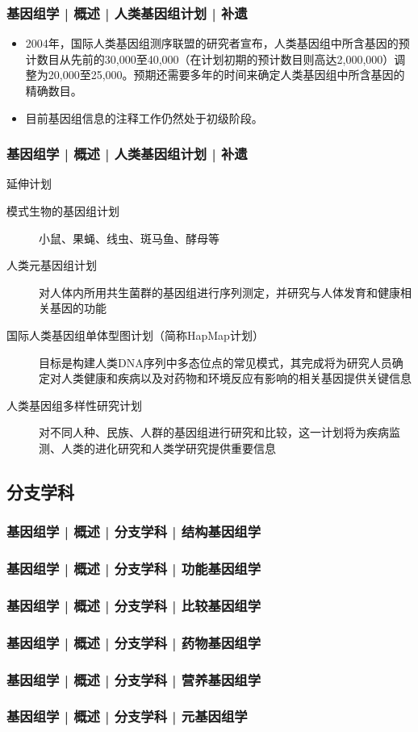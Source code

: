 \begin{frame}
  \frametitle{基因组学 | 概述 | 人类基因组计划 | 补遗}
  \begin{itemize}
    \item 2004年，国际人类基因组测序联盟的研究者宣布，人类基因组中所含基因的预计数目从先前的30,000至40,000（在计划初期的预计数目则高达2,000,000）调整为20,000至25,000。预期还需要多年的时间来确定人类基因组中所含基因的精确数目。
    \item 目前基因组信息的注释工作仍然处于初级阶段。
  \end{itemize}
\end{frame}

\begin{frame}
  \frametitle{基因组学 | 概述 | 人类基因组计划 | 补遗}
  \begin{block}{延伸计划}
    \begin{description}
      \item[模式生物的基因组计划] 小鼠、果蝇、线虫、斑马鱼、酵母等
      \item[人类元基因组计划] 对人体内所用共生菌群的基因组进行序列测定，并研究与人体发育和健康相关基因的功能
      \item[国际人类基因组单体型图计划（简称HapMap计划）] 目标是构建人类DNA序列中多态位点的常见模式，其完成将为研究人员确定对人类健康和疾病以及对药物和环境反应有影响的相关基因提供关键信息 
      \item[人类基因组多样性研究计划] 对不同人种、民族、人群的基因组进行研究和比较，这一计划将为疾病监测、人类的进化研究和人类学研究提供重要信息
    \end{description}
  \end{block}
\end{frame}

\subsection{分支学科}
\begin{frame}[label=current]
  \frametitle{基因组学 | 概述 | 分支学科 | 结构基因组学}
\end{frame}

\begin{frame}[label=current]
  \frametitle{基因组学 | 概述 | 分支学科 | 功能基因组学}
\end{frame}

\begin{frame}[label=current]
  \frametitle{基因组学 | 概述 | 分支学科 | 比较基因组学}
\end{frame}

\begin{frame}[label=current]
  \frametitle{基因组学 | 概述 | 分支学科 | 药物基因组学}
\end{frame}

\begin{frame}[label=current]
  \frametitle{基因组学 | 概述 | 分支学科 | 营养基因组学}
\end{frame}

\begin{frame}[label=current]
  \frametitle{基因组学 | 概述 | 分支学科 | 元基因组学}
\end{frame}

